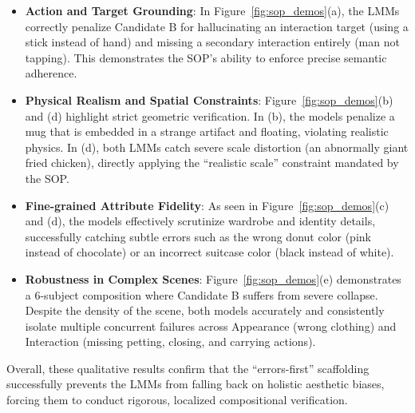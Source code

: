\begin{itemize}[leftmargin=*, label=$\bullet$]
    \item \textbf{Action and Target Grounding}: In Figure~\ref{fig:sop_demos}(a), the LMMs correctly penalize Candidate B for hallucinating an interaction target (using a stick instead of hand) and missing a secondary interaction entirely (man not tapping). This demonstrates the SOP's ability to enforce precise semantic adherence.
    \item \textbf{Physical Realism and Spatial Constraints}: Figure~\ref{fig:sop_demos}(b) and (d) highlight strict geometric verification. In (b), the models penalize a mug that is embedded in a strange artifact and floating, violating realistic physics. In (d), both LMMs catch severe scale distortion (an abnormally giant fried chicken), directly applying the ``realistic scale'' constraint mandated by the SOP.
    \item \textbf{Fine-grained Attribute Fidelity}: As seen in Figure~\ref{fig:sop_demos}(c) and (d), the models effectively scrutinize wardrobe and identity details, successfully catching subtle errors such as the wrong donut color (pink instead of chocolate) or an incorrect suitcase color (black instead of white).
    \item \textbf{Robustness in Complex Scenes}: Figure~\ref{fig:sop_demos}(e) demonstrates a 6-subject composition where Candidate B suffers from severe collapse. Despite the density of the scene, both models accurately and consistently isolate multiple concurrent failures across Appearance (wrong clothing) and Interaction (missing petting, closing, and carrying actions).
\end{itemize}

Overall, these qualitative results confirm that the ``errors-first'' scaffolding successfully prevents the LMMs from falling back on holistic aesthetic biases, forcing them to conduct rigorous, localized compositional verification.

